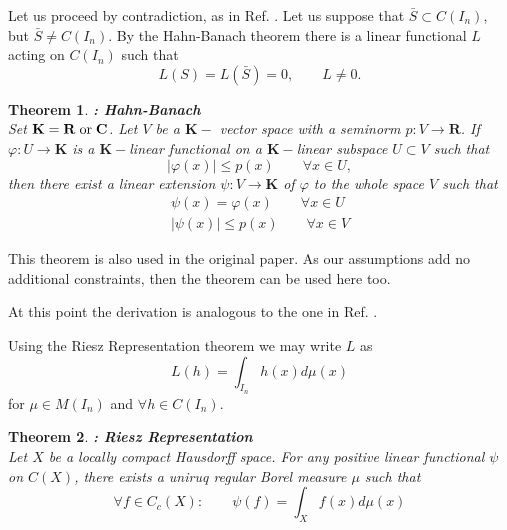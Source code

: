\documentclass[aps,amssymb,amsmath,amsfonts,pra,superscriptaddress,twocolumn]{revtex4}
\newtheorem{theorem}{Theorem}
\begin{document}
Let us proceed by contradiction, as in Ref. \cite{uat-cybenko1989}. Let us suppose that $\bar S \subset C(I_n)$, but $\bar S \neq C(I_n)$. By the Hahn-Banach theorem there is a linear functional $L$ acting on $C(I_n)$ such that
\begin{equation}
L(S) = L(\bar S) = 0 , \qquad L \neq 0.
\end{equation} 

\begin{theorem}
{\bf: Hahn-Banach} \cite{analysis-hahn1927, analysis-banach1929}\\

Set $\mathbf{K} = \mathbf{R} {\;\rm or\;} \mathbf{C}$. Let $V$ be a $\mathbf{K}-$ vector space with a seminorm $p: V \rightarrow \mathbf{R}$. If $\varphi : U \rightarrow \mathbf{K}$ is a $\mathbf{K}-$linear functional on a $\mathbf{K}-$linear subspace $U\subset V$ such that
\begin{equation}
|\varphi(x)| \leq p(x) \qquad \forall x \in U,
\end{equation}
then there exist a linear extension $\psi : V \rightarrow \mathbf{K}$ of $\varphi$ to the whole space $V$ such that
\begin{eqnarray}
\psi(x) = \varphi(x) \qquad \forall x\in U \\
|\psi(x)| \leq p(x) \qquad \forall x\in V
\end{eqnarray}
\end{theorem}
This theorem is also used in the original paper. As our assumptions add no additional constraints, then the theorem can be used here too. 

At this point the derivation is analogous to the one in Ref. \cite{uat-cybenko1989}. 

Using the Riesz Representation theorem we may write $L$ as
\begin{equation}
L(h) = \int_{I_n} h(x) d\mu(x)
\end{equation}
for $\mu\in M(I_n)$ and $\forall h \in C(I_n)$. 
\begin{theorem}
{\bf: Riesz Representation} \cite{analysis-riesz1914}\\

Let $X$ be a locally compact Hausdorff space. For any positive linear functional $\psi$ on $C(X)$, there exists a uniruq regular Borel measure $\mu$ such that
\begin{equation}
\forall f \in C_c(X): \qquad \psi(f) = \int_X f(x) d\mu(x)
\end{equation}
\end{theorem}
\end{document}
